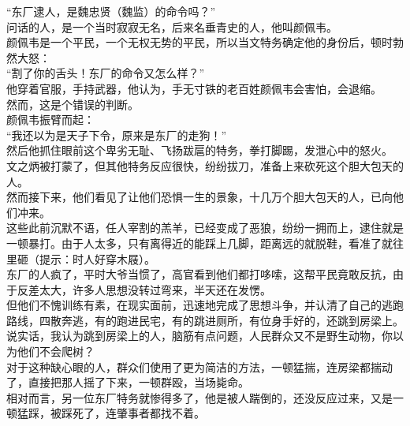 \begin{multicols}{\theparacolNo}
“东厂逮人，是魏忠贤（魏监）的命令吗？”\\

问话的人，是一个当时寂寂无名，后来名垂青史的人，他叫颜佩韦。\\

颜佩韦是一个平民，一个无权无势的平民，所以当文特务确定他的身份后，顿时勃然大怒：\\

“割了你的舌头！东厂的命令又怎么样？”\\

他穿着官服，手持武器，他认为，手无寸铁的老百姓颜佩韦会害怕，会退缩。\\

然而，这是个错误的判断。\\

颜佩韦振臂而起：\\

“我还以为是天子下令，原来是东厂的走狗！”\\

然后他抓住眼前这个卑劣无耻、飞扬跋扈的特务，拳打脚踢，发泄心中的怒火。\\

文之炳被打蒙了，但其他特务反应很快，纷纷拔刀，准备上来砍死这个胆大包天的人。\\

然而接下来，他们看见了让他们恐惧一生的景象，十几万个胆大包天的人，已向他们冲来。\\

这些此前沉默不语，任人宰割的羔羊，已经变成了恶狼，纷纷一拥而上，逮住就是一顿暴打。由于人太多，只有离得近的能踩上几脚，距离远的就脱鞋，看准了就往里砸（提示：时人好穿木屐）。\\

东厂的人疯了，平时大爷当惯了，高官看到他们都打哆嗦，这帮平民竟敢反抗，由于反差太大，许多人思想没转过弯来，半天还在发愣。\\

但他们不愧训练有素，在现实面前，迅速地完成了思想斗争，并认清了自己的逃跑路线，四散奔逃，有的跑进民宅，有的跳进厕所，有位身手好的，还跳到房梁上。\\

说实话，我认为跳到房梁上的人，脑筋有点问题，人民群众又不是野生动物，你以为他们不会爬树？\\

对于这种缺心眼的人，群众们使用了更为简洁的方法，一顿猛揣，连房梁都揣动了，直接把那人摇了下来，一顿群殴，当场毙命。\\

相对而言，另一位东厂特务就惨得多了，他是被人踹倒的，还没反应过来，又是一顿猛踩，被踩死了，连肇事者都找不着。\\


\end{multicols}
